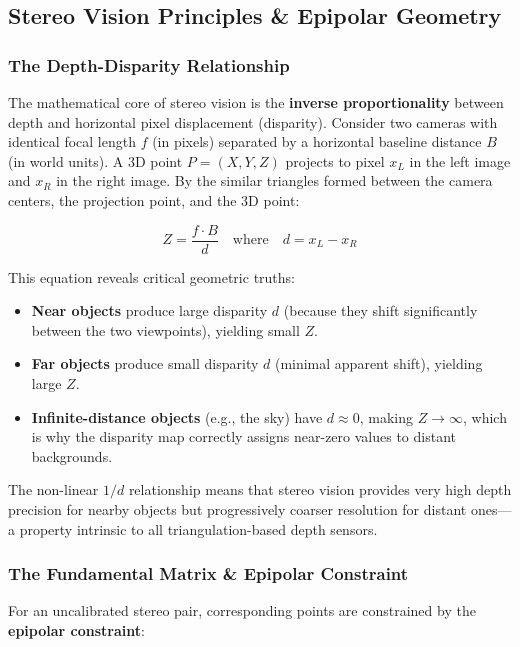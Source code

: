 \documentclass[a4paper,12pt]{article}
\begin{document}
\subsection{Stereo Vision Principles \& Epipolar Geometry}

\subsubsection{The Depth-Disparity Relationship}

The mathematical core of stereo vision is the \textbf{inverse proportionality} between depth and horizontal pixel displacement (disparity). Consider two cameras with identical focal length $f$ (in pixels) separated by a horizontal baseline distance $B$ (in world units). A 3D point $P = (X, Y, Z)$ projects to pixel $x_L$ in the left image and $x_R$ in the right image. By the similar triangles formed between the camera centers, the projection point, and the 3D point:

\begin{equation}
    Z = \frac{f \cdot B}{d} \quad \text{where} \quad d = x_L - x_R
\end{equation}

This equation reveals critical geometric truths:
\begin{itemize}
    \item \textbf{Near objects} produce large disparity $d$ (because they shift significantly between the two viewpoints), yielding small $Z$.
    \item \textbf{Far objects} produce small disparity $d$ (minimal apparent shift), yielding large $Z$.
    \item \textbf{Infinite-distance objects} (e.g., the sky) have $d \approx 0$, making $Z \to \infty$, which is why the disparity map correctly assigns near-zero values to distant backgrounds.
\end{itemize}

The non-linear $1/d$ relationship means that stereo vision provides very high depth precision for nearby objects but progressively coarser resolution for distant ones---a property intrinsic to all triangulation-based depth sensors.

\subsubsection{The Fundamental Matrix \& Epipolar Constraint}

For an uncalibrated stereo pair, corresponding points are constrained by the \textbf{epipolar constraint}:
\end{document}
